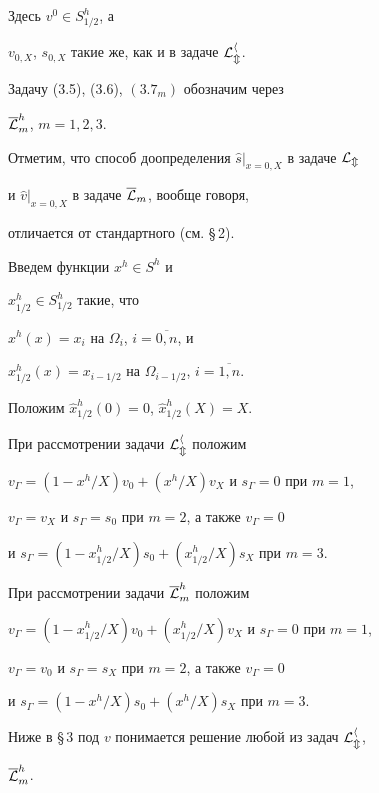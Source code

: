 \addtocounter{equation}{1}


Здесь $v^0\in S^h_{1/2}$, а


$v_{0,X}$, $s_{0,X}$ такие же, как и в задаче $\cal L_m^h$.


Задачу (3.5), (3.6), $(3.7_m)$ обозначим через


$\overline{\cal L}_m^h$, $m=1,2,3$.





Отметим, что способ доопределения $\widehat s|_{x=0,X}$ в задаче $\cal L_m$


и $\widehat v|_{x=0,X}$ в задаче $\overline{\cal L}_m$, вообще говоря,


отличается от стандартного (см. \S\,2).





Введем функции $x^h\in S^h$ и


$x^h_{1/2}\in S^h_{1/2}$ такие, что


$x^h(x)=x_i$ на $\Omega_i$, $i=\overline{0,n}$, и


$x^h_{1/2}(x)=x_{i-1/2}$ на $\Omega_{i-1/2}$, $i=\overline{1,n}$.


Положим $\widehat x^h_{1/2}(0)=0$, $\widehat x^h_{1/2}(X)=X$.


При рассмотрении задачи $\cal L_m^h$ положим


$v_\Gamma=(1-x^h/X)v_0+(x^h/X)v_X$ и $s_{\Gamma}=0$ при $m=1$,


$v_\Gamma=v_X$ и $s_{\Gamma}=s_0$ при $m=2$, а также $v_\Gamma=0$


и $s_{\Gamma}=(1-x^h_{1/2}/X)s_0+(x^h_{1/2}/X)s_X$ при $m=3$.


При рассмотрении задачи $\overline{\cal L}_m^h$ положим


$v_\Gamma=(1-x^h_{1/2}/X)v_0+(x^h_{1/2}/X)v_X$ и $s_{\Gamma}=0$ при $m=1$,


$v_{\Gamma}=v_0$ и $s_\Gamma=s_X$ при $m=2$, а также $v_\Gamma=0$


и $s_{\Gamma}=(1-x^h/X)s_0+(x^h/X)s_X$ при $m=3$.





Ниже в \S\,3 под $v$ понимается решение любой из задач $\cal L_m^h$,


$\overline{\cal L}^h_m$.





